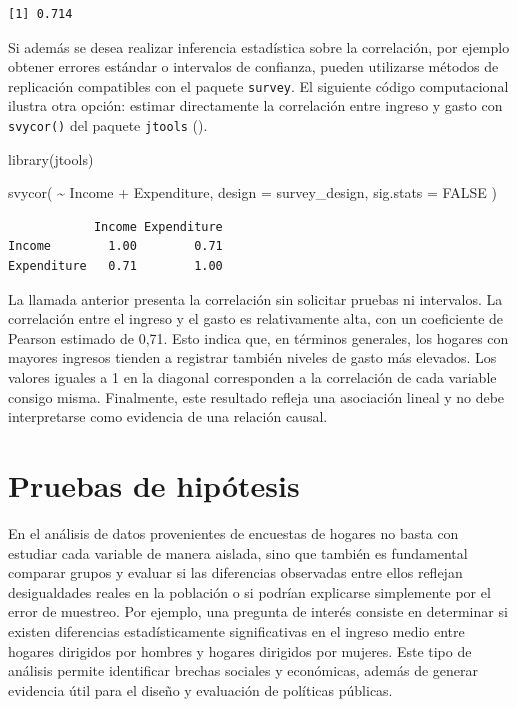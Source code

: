 \documentclass[
  spanish,
  11pt,
  letterpaper,
  oneside,
  open=any]{scrbook}
\newenvironment{Shaded}{\begin{snugshade}}{\end{snugshade}}
\newcommand{\AttributeTok}[1]{\textcolor[rgb]{0.40,0.45,0.13}{#1}}
\newcommand{\ConstantTok}[1]{\textcolor[rgb]{0.56,0.35,0.01}{#1}}
\newcommand{\FunctionTok}[1]{\textcolor[rgb]{0.28,0.35,0.67}{#1}}
\newcommand{\NormalTok}[1]{\textcolor[rgb]{0.00,0.23,0.31}{#1}}
\newcommand{\SpecialCharTok}[1]{\textcolor[rgb]{0.37,0.37,0.37}{#1}}
\begin{document}
\begin{verbatim}
[1] 0.714
\end{verbatim}

Si además se desea realizar inferencia estadística sobre la correlación,
por ejemplo obtener errores estándar o intervalos de confianza, pueden
utilizarse métodos de replicación compatibles con el paquete
\texttt{survey}. El siguiente código computacional ilustra otra opción:
estimar directamente la correlación entre ingreso y gasto con
\texttt{svycor()} del paquete \texttt{jtools}
().

\begin{Shaded}
\begin{Highlighting}[]
\FunctionTok{library}\NormalTok{(jtools)}

\FunctionTok{svycor}\NormalTok{(}
  \SpecialCharTok{\textasciitilde{}}\NormalTok{ Income }\SpecialCharTok{+}\NormalTok{ Expenditure,}
  \AttributeTok{design =}\NormalTok{ survey\_design,}
  \AttributeTok{sig.stats =} \ConstantTok{FALSE}
\NormalTok{)}
\end{Highlighting}
\end{Shaded}

\begin{verbatim}
            Income Expenditure
Income        1.00        0.71
Expenditure   0.71        1.00
\end{verbatim}

La llamada anterior presenta la correlación sin solicitar pruebas ni
intervalos. La correlación entre el ingreso y el gasto es relativamente
alta, con un coeficiente de Pearson estimado de 0,71. Esto indica que,
en términos generales, los hogares con mayores ingresos tienden a
registrar también niveles de gasto más elevados. Los valores iguales a 1
en la diagonal corresponden a la correlación de cada variable consigo
misma. Finalmente, este resultado refleja una asociación lineal y no
debe interpretarse como evidencia de una relación causal.

\section{Pruebas de hipótesis}\label{pruebas-de-hipotesis}

En el análisis de datos provenientes de encuestas de hogares no basta
con estudiar cada variable de manera aislada, sino que también es
fundamental comparar grupos y evaluar si las diferencias observadas
entre ellos reflejan desigualdades reales en la población o si podrían
explicarse simplemente por el error de muestreo. Por ejemplo, una
pregunta de interés consiste en determinar si existen diferencias
estadísticamente significativas en el ingreso medio entre hogares
dirigidos por hombres y hogares dirigidos por mujeres. Este tipo de
análisis permite identificar brechas sociales y económicas, además de
generar evidencia útil para el diseño y evaluación de políticas
públicas.
\end{document}
